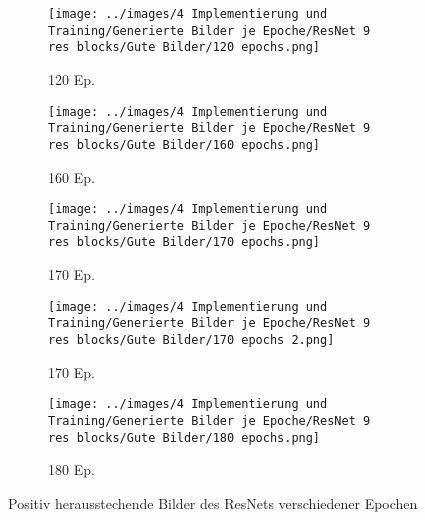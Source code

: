 \begin{figure}[h]
    \centering
    \begin{subfigure}[b]{0.12\textwidth}
        \centering
        \texttt{[image: ../images/4 Implementierung und Training/Generierte Bilder je Epoche/ResNet 9 res blocks/Gute Bilder/120 epochs.png]}
        \caption{120 Ep.}
    \end{subfigure}
    \hspace{3em}%
    \begin{subfigure}[b]{0.12\textwidth}
        \centering
        \texttt{[image: ../images/4 Implementierung und Training/Generierte Bilder je Epoche/ResNet 9 res blocks/Gute Bilder/160 epochs.png]}
        \caption{160 Ep.}
    \end{subfigure}
    \hspace{3em}%
    \begin{subfigure}[b]{0.12\textwidth}
        \centering
        \texttt{[image: ../images/4 Implementierung und Training/Generierte Bilder je Epoche/ResNet 9 res blocks/Gute Bilder/170 epochs.png]}
        \caption{170 Ep.}
    \end{subfigure}
    \hspace{3em}%
    \begin{subfigure}[b]{0.12\textwidth}
        \centering
        \texttt{[image: ../images/4 Implementierung und Training/Generierte Bilder je Epoche/ResNet 9 res blocks/Gute Bilder/170 epochs 2.png]}
        \caption{170 Ep.}
    \end{subfigure}
    \hspace{3em}%
    \begin{subfigure}[b]{0.12\textwidth}
    \centering
    \texttt{[image: ../images/4 Implementierung und Training/Generierte Bilder je Epoche/ResNet 9 res blocks/Gute Bilder/180 epochs.png]}
    \caption{180 Ep.}
\end{subfigure}
        \caption{Positiv herausstechende Bilder des ResNets verschiedener Epochen}
        \label{fig:resnet-gute-bilder}
\end{figure}

